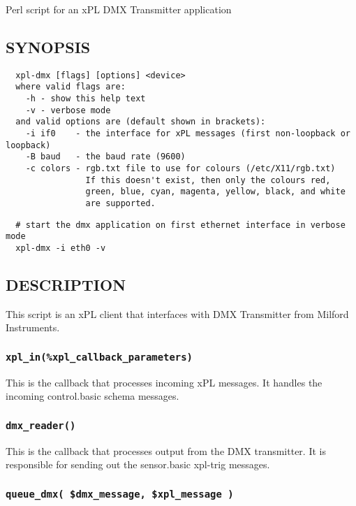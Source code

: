 Perl script for an xPL DMX Transmitter application

\subsection*{SYNOPSIS\label{xpl-dmx_SYNOPSIS}}
\begin{verbatim}
  xpl-dmx [flags] [options] <device>
  where valid flags are:
    -h - show this help text
    -v - verbose mode
  and valid options are (default shown in brackets):
    -i if0    - the interface for xPL messages (first non-loopback or loopback)
    -B baud   - the baud rate (9600)
    -c colors - rgb.txt file to use for colours (/etc/X11/rgb.txt)
                If this doesn't exist, then only the colours red,
                green, blue, cyan, magenta, yellow, black, and white
                are supported.
\end{verbatim}
\begin{verbatim}
  # start the dmx application on first ethernet interface in verbose mode
  xpl-dmx -i eth0 -v
\end{verbatim}
\subsection*{DESCRIPTION\label{xpl-dmx_DESCRIPTION}}


This script is an xPL client that interfaces with DMX Transmitter from
Milford Instruments.

\subsubsection*{\texttt{xpl\_in(\%xpl\_callback\_parameters)}\label{xpl-dmx_xpl_in_xpl_callback_parameters_}}


This is the callback that processes incoming xPL messages.  It handles
the incoming control.basic schema messages.

\subsubsection*{\texttt{dmx\_reader()}\label{xpl-dmx_dmx_reader_}}


This is the callback that processes output from the DMX transmitter.
It is responsible for sending out the sensor.basic xpl-trig messages.

\subsubsection*{\texttt{queue\_dmx( \$dmx\_message, \$xpl\_message )}\label{xpl-dmx_queue_dmx_dmx_message_xpl_message_}}


